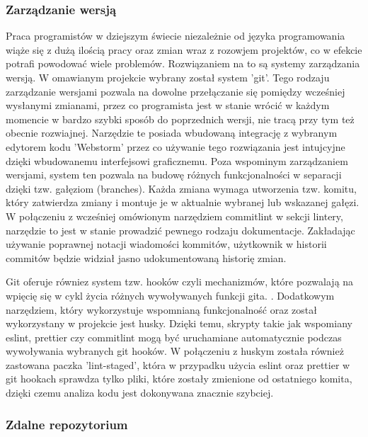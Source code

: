 \subsubsection{Zarządzanie wersją}

Praca programistów w dziejszym świecie niezależnie od języka programowania wiąże się z dużą ilością pracy oraz zmian wraz z rozowjem projektów, co w efekcie potrafi powodować wiele problemów. Rozwiązaniem na to są systemy zarządzania wersją. W omawianym projekcie wybrany został system 'git'. Tego rodzaju zarządzanie wersjami pozwala na dowolne przełączanie się pomiędzy wcześniej wysłanymi zmianami, przez co programista jest w stanie wrócić w każdym momencie w bardzo szybki sposób do poprzednich wersji, nie tracą przy tym też obecnie rozwiajnej. Narzędzie te posiada wbudowaną integrację z wybranym edytorem kodu 'Webstorm' przez co używanie tego rozwiązania jest intujcyjne dzięki wbudowanemu interfejsowi graficznemu. Poza wspominym zarządzaniem wersjami, system ten pozwala na budowę różnych funkcjonalności w separacji dzięki tzw. gałęziom (branches). Każda zmiana wymaga utworzenia tzw. komitu, który zatwierdza zmiany i montuje je w aktualnie wybranej lub wskazanej gałęzi.
W połączeniu z wcześniej omówionym narzędziem commitlint w sekcji lintery, narzędzie to jest w stanie prowadzić pewnego rodzaju dokumentacje. Zakładając używanie poprawnej notacji wiadomości kommitów, użytkownik w historii commitów będzie widział jasno udokumentowaną historię zmian.

Git oferuje równiez system tzw. hooków czyli mechanizmów, które pozwalają na wpięcię się w cykl życia różnych wywoływanych funkcji gita. \cite{GitHooksDocs}. Dodatkowym narzędziem, który wykorzystuje wspomnianą funkcjonalność oraz został wykorzystany w projekcie jest husky. Dzięki temu, skrypty takie jak wspomiany eslint, prettier czy commitlint mogą być uruchamiane automatycznie podczas wywoływania wybranych git hooków. W połączeniu z huskym została również zastowana paczka 'lint-staged', która w przypadku użycia eslint oraz prettier w git hookach sprawdza tylko pliki, które zostały zmienione od ostatniego komita, dzięki czemu analiza kodu jest dokonywana znacznie szybciej.

\subsubsection{Zdalne repozytorium}

